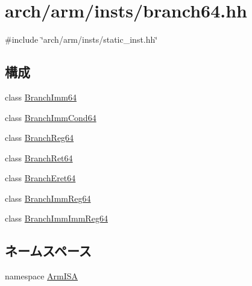 \hypertarget{branch64_8hh}{
\section{arch/arm/insts/branch64.hh}
\label{branch64_8hh}
}
{\ttfamily \#include \char`\"{}arch/arm/insts/static\_\-inst.hh\char`\"{}}\par
\subsection*{構成}
\begin{DoxyCompactItemize}
\item 
class \hyperlink{classArmISA_1_1BranchImm64}{BranchImm64}
\item 
class \hyperlink{classArmISA_1_1BranchImmCond64}{BranchImmCond64}
\item 
class \hyperlink{classArmISA_1_1BranchReg64}{BranchReg64}
\item 
class \hyperlink{classArmISA_1_1BranchRet64}{BranchRet64}
\item 
class \hyperlink{classArmISA_1_1BranchEret64}{BranchEret64}
\item 
class \hyperlink{classArmISA_1_1BranchImmReg64}{BranchImmReg64}
\item 
class \hyperlink{classArmISA_1_1BranchImmImmReg64}{BranchImmImmReg64}
\end{DoxyCompactItemize}
\subsection*{ネームスペース}
\begin{DoxyCompactItemize}
\item 
namespace \hyperlink{namespaceArmISA}{ArmISA}
\end{DoxyCompactItemize}

